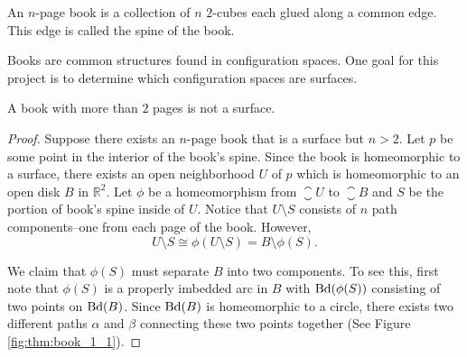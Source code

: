 \begin{defn}
    An \(n\)-page book is a collection of \(n\) \(2\)-cubes each glued along a common edge.
    This edge is called the spine of the book.
\end{defn}

Books are common structures found in configuration spaces.
One goal for this project is to determine which configuration spaces are surfaces.

\begin{thm}
A book with more than \(2\) pages is not a surface.
\end{thm}
\begin{proof}
Suppose there exists an \(n\)-page book that is a surface but \(n > 2\).
Let \(p\) be some point in the interior of the book's spine.
Since the book is homeomorphic to a surface, there exists an open neighborhood \(U\) of \(p\)
which is homeomorphic to an open disk \(B\) in \(\mathbb{R}^2\).
Let \(\phi\) be a homeomorphism from \(\closure{U}\) to \(\closure{B}\) and \(S\) be the portion of book's spine inside of \(U\).
Notice that \(U \setminus S\) consists of \(n\) path components--one from each page of the book.
However,
\[
U\setminus S \cong \phi(U\setminus S) = B \setminus \phi(S).
\]

We claim that \(\phi(S)\) must separate \(B\) into two components.
To see this, first note that \(\phi(S)\) is a properly imbedded arc in \(B\) with \(\mathrm{Bd}(\phi(S))\) consisting of two
points on \(\mathrm{Bd}(B)\).
Since \(\mathrm{Bd}(B)\) is homeomorphic to a circle, there exists two different paths \(\alpha\) and \(\beta\) 
connecting these two points together (See Figure \ref{fig:thm:book_1_1}).


\end{proof}
